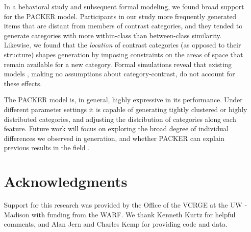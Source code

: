 \documentclass[10pt,letterpaper]{article}
\begin{document}
In a behavioral study and subsequent formal modeling, we found broad support for the PACKER model. Participants in our study more frequently generated items that are distant from members of contrast categories, and they tended to generate categories with more within-class than between-class similarity. Likewise, we found that the \textit{location} of contrast categories (as opposed to their structure) shapes generation by imposing constraints on the areas of space that remain available for a new category. Formal simulations reveal that existing models \citep[see][]{jern2013probabilistic}, making no assumptions about category-contrast, do not account for these effects.

The PACKER model is, in general, highly expressive in its performance. Under different parameter settings it is capable of generating tightly clustered or highly distributed categories, and adjusting the distribution of categories along each feature. Future work will focus on exploring the broad degree of individual differences we observed in generation, and whether PACKER can explain previous results in the field \citep{ward1994structured,jern2013probabilistic}.

\section{Acknowledgments}
Support for this research was provided by the Office of the VCRGE at the UW - Madison with funding from the WARF. We thank Kenneth Kurtz for helpful comments, and Alan Jern and Charles Kemp for providing code and data.



\setlength{\bibleftmargin}{.025in}
\setlength{\bibindent}{-\bibleftmargin}

\end{document}
